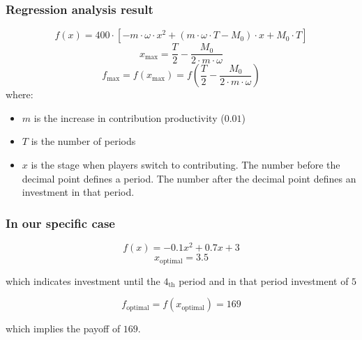 		\begin{frame}
			\frametitle{Regression analysis result}
			\[
				f(x) = 400 \cdot \left[ -m \cdot \omega \cdot x^2 + (m \cdot \omega \cdot T - M_0) \cdot x + M_0 \cdot T \right]
			\]
			\[
				x_\text{max} = \frac{T}{2} - \frac{M_0}{2 \cdot m \cdot \omega}
			\]
			\[
				f_\text{max} = f(x_\text{max}) = f \left(\frac{T}{2} - \frac{M_0}{2 \cdot m \cdot \omega} \right)
			\]
			where:
			\begin{itemize}
				\item
					$m$ is the increase in contribution productivity ($0.01$)
				\item
					$T$ is the number of periods
				\item
					$x$ is the stage when players switch to contributing.
					The number before the decimal point defines a period.
					The number after the decimal point defines an investment in that period.
			\end{itemize}
		\end{frame}

		\begin{frame}
			\frametitle{In our specific case}
			\[
				f(x) = -0.1 x^2 + 0.7 x + 3
			\]
			\[
				x_{\text{optimal}} = 3.5
			\]
			
			which indicates investment until the $4_\text{th}$ period and in that period investment of $5$
			
			\[
				f_{\text{optimal}} = f(x_{\text{optimal}}) = 169
			\]
			
			which implies the payoff of $169$.
		\end{frame}
